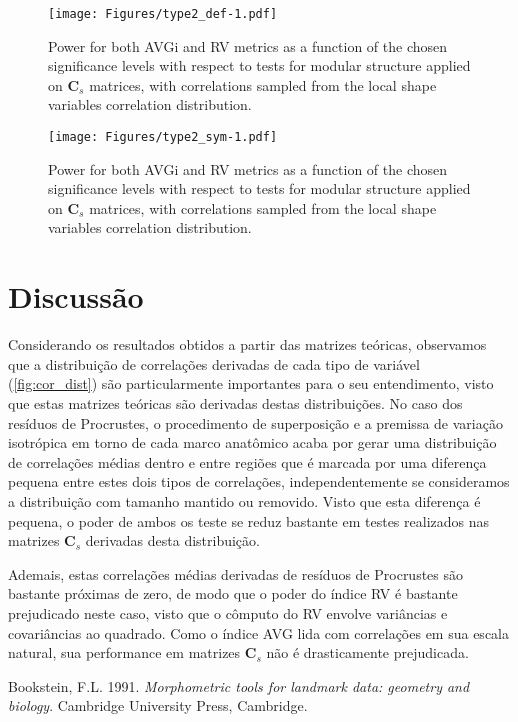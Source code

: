 \documentclass[12pt,]{article}
\begin{document}
\begin{figure}[htbp]
\centering
\texttt{[image: Figures/type2\_def-1.pdf]}
\caption{Power for both AVGi and RV metrics as a function of the chosen
significance levels with respect to tests for modular structure applied
on $\mathbf{C}_s$ matrices, with correlations sampled from the local
shape variables correlation distribution. \label{fig:type2_def}}
\end{figure}

\begin{figure}[htbp]
\centering
\texttt{[image: Figures/type2\_sym-1.pdf]}
\caption{Power for both AVGi and RV metrics as a function of the chosen
significance levels with respect to tests for modular structure applied
on $\mathbf{C}_s$ matrices, with correlations sampled from the local
shape variables correlation distribution. \label{fig:type2_sym}}
\end{figure}

\section{Discussão}\label{discussao}

Considerando os resultados obtidos a partir das matrizes teóricas,
observamos que a distribuição de correlações derivadas de cada tipo de
variável (\autoref{fig:cor_dist}) são particularmente importantes para o
seu entendimento, visto que estas matrizes teóricas são derivadas destas
distribuições. No caso dos resíduos de Procrustes, o procedimento de
superposição e a premissa de variação isotrópica em torno de cada marco
anatômico acaba por gerar uma distribuição de correlações médias dentro
e entre regiões que é marcada por uma diferença pequena entre estes dois
tipos de correlações, independentemente se consideramos a distribuição
com tamanho mantido ou removido. Visto que esta diferença é pequena, o
poder de ambos os teste se reduz bastante em testes realizados nas
matrizes $\mathbf{C}_s$ derivadas desta distribuição.

Ademais, estas correlações médias derivadas de resíduos de Procrustes
são bastante próximas de zero, de modo que o poder do índice RV é
bastante prejudicado neste caso, visto que o cômputo do RV envolve
variâncias e covariâncias ao quadrado. Como o índice AVG lida com
correlações em sua escala natural, sua performance em matrizes
$\mathbf{C}_s$ não é drasticamente prejudicada.

Bookstein, F.L. 1991. \emph{Morphometric tools for landmark data:
geometry and biology}. Cambridge University Press, Cambridge.
\end{document}
